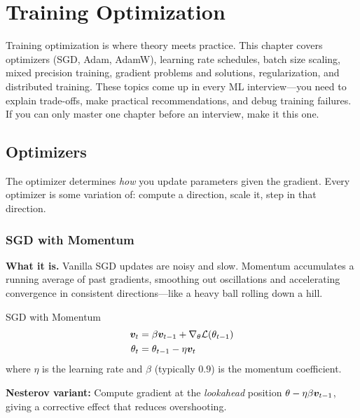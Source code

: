 \chapter{Training Optimization}
\label{chap:training_optimization}

\begin{tldr}
Training optimization is where theory meets practice. This chapter covers optimizers (SGD, Adam, AdamW), learning rate schedules, batch size scaling, mixed precision training, gradient problems and solutions, regularization, and distributed training. These topics come up in every ML interview---you need to explain trade-offs, make practical recommendations, and debug training failures. If you can only master one chapter before an interview, make it this one.
\end{tldr}

\section{Optimizers}
\label{sec:optimizers}

The optimizer determines \textit{how} you update parameters given the gradient. Every optimizer is some variation of: compute a direction, scale it, step in that direction.

\subsection{SGD with Momentum}

\textbf{What it is.} Vanilla SGD updates are noisy and slow. Momentum accumulates a running average of past gradients, smoothing out oscillations and accelerating convergence in consistent directions---like a heavy ball rolling down a hill.

\begin{mathresult}{SGD with Momentum}
\begin{align}
\bm{v}_t &= \beta \bm{v}_{t-1} + \nabla_\theta \mathcal{L}(\theta_{t-1}) \\
\theta_t &= \theta_{t-1} - \eta \bm{v}_t
\end{align}
where $\eta$ is the learning rate and $\beta$ (typically $0.9$) is the momentum coefficient.

\textbf{Nesterov variant:} Compute gradient at the \emph{lookahead} position $\theta - \eta \beta \bm{v}_{t-1}$, giving a corrective effect that reduces overshooting.
\end{mathresult}

